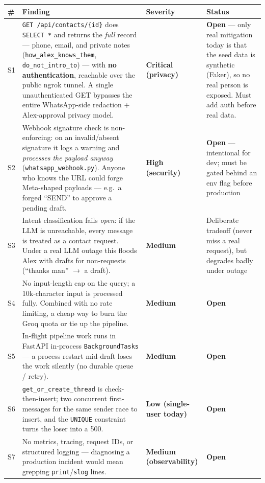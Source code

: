 \documentclass[11pt, a4paper]{article}
\newcommand{\warnc}[1]{\textcolor{warn}{\textbf{#1}}}
\newcommand{\badc}[1]{\textcolor{bad}{\textbf{#1}}}
\begin{document}
\begin{longtable}{@{}p{0.3cm}p{6.8cm}p{2.6cm}p{3.2cm}@{}}
\toprule
\# & Finding & Severity & Status \\
\midrule
\endhead
S1 & \texttt{GET /api/contacts/\{id\}} does \texttt{SELECT *} and returns the \emph{full} record --- phone, email, and private notes (\texttt{how\_alex\_knows\_them}, \texttt{do\_not\_intro\_to}) --- with \textbf{no authentication}, reachable over the public ngrok tunnel. A single unauthenticated GET bypasses the entire WhatsApp-side redaction + Alex-approval privacy model. & \badc{Critical (privacy)} & \warnc{Open} --- only real mitigation today is that the seed data is synthetic (Faker), so no real person is exposed. Must add auth before real data. \\
S2 & Webhook signature check is non-enforcing: on an invalid/absent signature it logs a warning and \emph{processes the payload anyway} (\texttt{whatsapp\_webhook.py}). Anyone who knows the URL could forge Meta-shaped payloads --- e.g.\ a forged ``SEND'' to approve a pending draft. & \badc{High (security)} & \warnc{Open} --- intentional for dev; must be gated behind an env flag before production \\
S3 & Intent classification fails \emph{open}: if the LLM is unreachable, every message is treated as a contact request. Under a real LLM outage this floods Alex with drafts for non-requests (``thanks man'' $\to$ a draft). & \warnc{Medium} & Deliberate tradeoff (never miss a real request), but degrades badly under outage \\
S4 & No input-length cap on the query; a 10k-character input is processed fully. Combined with no rate limiting, a cheap way to burn the Groq quota or tie up the pipeline. & \warnc{Medium} & \warnc{Open} \\
S5 & In-flight pipeline work runs in FastAPI in-process \texttt{BackgroundTasks} --- a process restart mid-draft loses the work silently (no durable queue / retry). & \warnc{Medium} & \warnc{Open} \\
S6 & \texttt{get\_or\_create\_thread} is check-then-insert; two concurrent first-messages for the same sender race to insert, and the \texttt{UNIQUE} constraint turns the loser into a 500. & \warnc{Low (single-user today)} & \warnc{Open} \\
S7 & No metrics, tracing, request IDs, or structured logging --- diagnosing a production incident would mean grepping \texttt{print}/\texttt{slog} lines. & \warnc{Medium (observability)} & \warnc{Open} \\
\bottomrule
\end{longtable}
\end{document}
